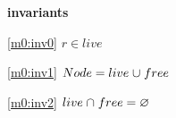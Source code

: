 \textbf{invariants}
\begin{block}
\item[ \eqref{m0:inv0} ]{$r \in live$} %
\item[ \eqref{m0:inv1} ]{$Node = live \mathbin{\mkern1mu\cup\mkern1mu} free $} %
\item[ \eqref{m0:inv2} ]{$live \mathbin{\mkern1mu\cap\mkern1mu} free = \mathord\varnothing $} %
\end{block}
